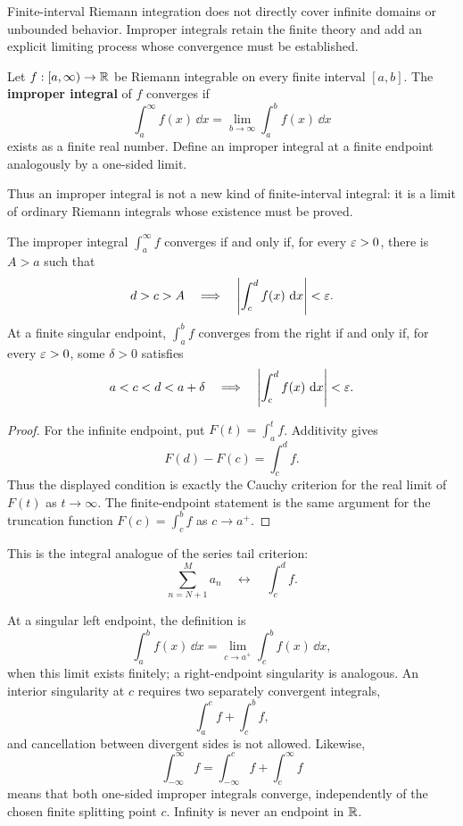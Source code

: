Finite-interval Riemann integration does not directly cover infinite domains
or unbounded behavior.  Improper integrals retain the finite theory and add
an explicit limiting process whose convergence must be established.

\begin{definition}
Let $f:[a,\infty)\to\mathbb{R}$ be Riemann integrable on every finite interval $[a,b]$. The \textbf{improper integral} of $f$ converges if
\[
\int_a^{\infty}f(x)\,\dd x
=\lim_{b\to\infty}\int_a^b f(x)\,\dd x
\]
exists as a finite real number. Define an improper integral at a finite endpoint analogously by a one-sided limit.
\end{definition}

Thus an improper integral is not a new kind of finite-interval integral: it is a limit of ordinary Riemann integrals whose existence must be proved.

\begin{theorem}
\label{thm:improper-cauchy}
The improper integral $\int_a^\infty f$ converges if and only if, for every
$\varepsilon>0$, there is $A>a$ such that
\[
d>c>A\quad\Longrightarrow\quad
\left|\int_c^d f(x)\,\mathop{}\!\mathrm{d} x\right|<\varepsilon.
\]
At a finite singular endpoint, $\int_a^b f$ converges from the right if
and only if, for every $\varepsilon>0$, some $\delta>0$ satisfies
\[
a<c<d<a+\delta\quad\Longrightarrow\quad
\left|\int_c^d f(x)\,\mathop{}\!\mathrm{d} x\right|<\varepsilon.
\]
\end{theorem}
\begin{proof}
For the infinite endpoint, put $F(t)=\int_a^t f$. Additivity gives
\[
F(d)-F(c)=\int_c^d f.
\]
Thus the displayed condition is exactly the Cauchy criterion for the real
limit of $F(t)$ as $t\to\infty$. The finite-endpoint statement is the same
argument for the truncation function $F(c)=\int_c^b f$ as $c\to a^+$.
\end{proof}
This is the integral analogue of the series tail criterion:
\[
\sum_{n=N+1}^M a_n\quad\longleftrightarrow\quad\int_c^d f.
\]

At a singular left endpoint, the definition is
\[
\int_a^b f(x)\,\dd x
=\lim_{c\to a^+}\int_c^b f(x)\,\dd x,
\]
when this limit exists finitely; a right-endpoint singularity is analogous.
An interior singularity at $c$ requires two separately convergent integrals,
\[
\int_a^c f+\int_c^b f,
\]
and cancellation between divergent sides is not allowed.  Likewise,
\[
\int_{-\infty}^{\infty}f
=\int_{-\infty}^{c}f+\int_c^{\infty}f
\]
means that both one-sided improper integrals converge, independently of the
chosen finite splitting point $c$.  Infinity is never an endpoint in $\mathbb{R}$.

